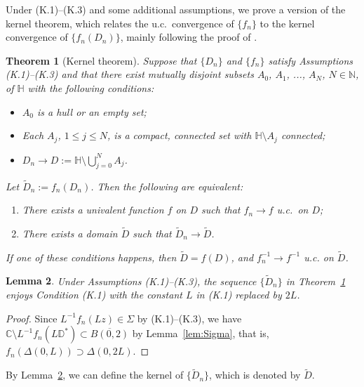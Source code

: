\documentclass[preprint,12pt]{elsarticle}
\newtheorem{thm}{Theorem}[section]
\newtheorem{lem}[thm]{Lemma}
\theoremstyle{definition}
\newcommand{\C}{\mathbb{C}}
\newcommand{\N}{\mathbb{N}}
\newcommand{\disk}{\mathbb{D}}
\newcommand{\uhp}{\mathbb{H}}
\begin{document}
Under (K.1)--(K.3) and some additional assumptions,
we prove a version of the kernel theorem,
which relates the u.c.\ convergence of $\{f_n\}$
to the kernel convergence of $\{f_n(D_n)\}$,
mainly following the proof of \cite[Theorem~V.5.1]{Go69}.

\begin{thm}[Kernel theorem] \label{prop:kerthmH}
Suppose that $\{D_n\}$ and $\{f_n\}$ satisfy Assumptions {\rm (K.1)--(K.3)}
and that there exist mutually disjoint subsets $A_0$, $A_1$, ..., $A_N$, $N \in \N$,
of $\uhp$ with the following conditions:
\begin{itemize}
\item $A_0$ is a hull or an empty set;
\item Each $A_j$, $1 \leq j \leq N$, is a compact, connected set
with $\uhp \setminus A_j$ connected;
\item $D_n \to D:=\uhp \setminus \bigcup_{j=0}^N A_j$.
\end{itemize}
Let $\tilde{D}_n:=f_n(D_n)$.
Then the following are equivalent:
\begin{enumerate}
\item \label{cond:ucconv} There exists a univalent function $f$ on $D$
such that $f_n \to f$ u.c.\ on $D$;
\item \label{cond:kerconv} There exists a domain $\tilde{D}$
such that $\tilde{D}_n \to \tilde{D}$.
\end{enumerate}
If one of these conditions happens, then $\tilde{D}=f(D)$, and
$f_n^{-1} \to f^{-1}$ u.c. on $\tilde{D}$.
\end{thm}

\begin{lem} \label{lem:K1forIm}
Under Assumptions {\rm (K.1)--(K.3)}, the sequence $\{\tilde{D}_n\}$
in Theorem~\ref{prop:kerthmH} enjoys Condition {\rm (K.1)}
with the constant $L$ in {\rm (K.1)} replaced by $2L$.
\end{lem}

\begin{proof}
Since $L^{-1}f_n(Lz) \in \Sigma$ by (K.1)--(K.3),
we have $\C \setminus L^{-1}f_n(L\disk^*) \subset \overline{B(0, 2)}$
by Lemma~\ref{lem:Sigma}, that is, $f_n(\Delta(0, L)) \supset \Delta(0, 2L)$.
\end{proof}

By Lemma~\ref{lem:K1forIm}, we can define the kernel of $\{\tilde{D}_n\}$,
which is denoted by $\tilde{D}$.
\end{document}
